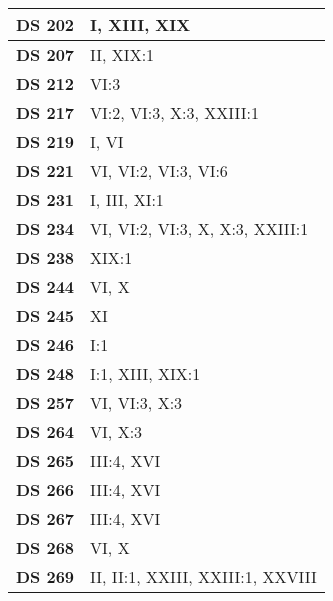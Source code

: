 \begin{xltabular}{\linewidth}{ l | X }
    \textbf {DS 202} & I, XIII, XIX \\ \hline 
    
    \textbf {DS 207} & II, XIX:1 \\ \hline 
    
    \textbf {DS 212} & VI:3 \\ \hline 
    
    \textbf {DS 217} & VI:2, VI:3, X:3, XXIII:1 \\ \hline 
    
    \textbf {DS 219} & I, VI \\ \hline 
    
    \textbf {DS 221} & VI, VI:2, VI:3, VI:6 \\ \hline 
    
    \textbf {DS 231} & I, III, XI:1 \\ \hline 
    
    \textbf {DS 234} & VI, VI:2, VI:3, X, X:3, XXIII:1 \\ \hline 
    
    \textbf {DS 238} & XIX:1 \\ \hline 
    
    \textbf {DS 244} & VI, X \\ \hline 
    
    \textbf {DS 245} & XI \\ \hline 
    
    \textbf {DS 246} & I:1 \\ \hline 
    
    \textbf {DS 248} & I:1, XIII, XIX:1 \\ \hline 
    
    \textbf {DS 257} & VI, VI:3, X:3 \\ \hline 
    
    \textbf {DS 264} & VI, X:3 \\ \hline 
    
    \textbf {DS 265} & III:4, XVI \\ \hline 
    
    \textbf {DS 266} & III:4, XVI \\ \hline 
    
    \textbf {DS 267} & III:4, XVI \\ \hline 
    
    \textbf {DS 268} & VI, X \\ \hline 
    
    \textbf {DS 269} & II, II:1, XXIII, XXIII:1, XXVIII \\ \hline 
    

\end{xltabular}
